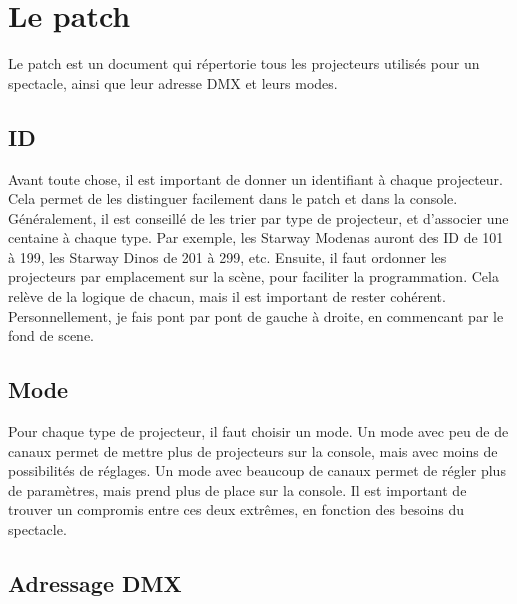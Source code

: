 \section{Le patch}
\label{sec:patch}

Le patch est un document qui répertorie tous les projecteurs utilisés pour un spectacle, ainsi que leur adresse DMX et leurs modes.

\subsection{ID}
\label{subsec:patch_id}

Avant toute chose, il est important de donner un identifiant à chaque projecteur. Cela permet de les distinguer facilement dans le patch et dans la console.
Généralement, il est conseillé de les trier par type de projecteur, et d'associer une centaine à chaque type.
Par exemple, les Starway Modenas auront des ID de 101 à 199, les Starway Dinos de 201 à 299, etc.
Ensuite, il faut ordonner les projecteurs par emplacement sur la scène, pour faciliter la programmation. Cela relève de la logique de chacun, mais il est important de rester cohérent.
Personnellement, je fais pont par pont de gauche à droite, en commencant par le fond de scene.

\subsection{Mode}
\label{subsec:patch_mode}

Pour chaque type de projecteur, il faut choisir un mode.
Un mode avec peu de de canaux permet de mettre plus de projecteurs sur la console, mais avec moins de possibilités de réglages.
Un mode avec beaucoup de canaux permet de régler plus de paramètres, mais prend plus de place sur la console.
Il est important de trouver un compromis entre ces deux extrêmes, en fonction des besoins du spectacle.

\subsection{Adressage DMX}
\label{subsec:patch_adressage}

